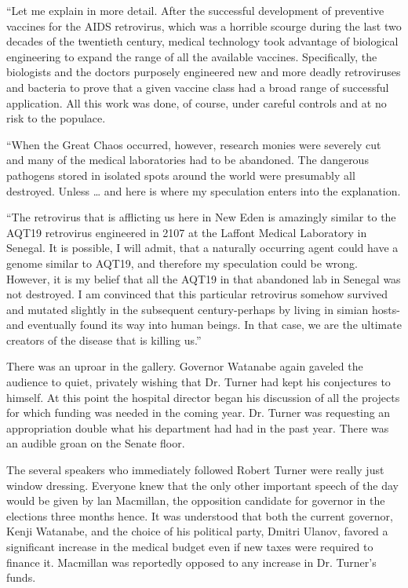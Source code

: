 \documentclass[]{article}
\begin{document}
{“Let me explain in more detail.  After the successful development of preventive vaccines for the AIDS retrovirus, which was a horrible scourge during the last two decades of the twentieth century, medical technology took advantage of biological engineering to expand the range of all the available vaccines.  Specifically, the biologists and the doctors purposely engineered new and more deadly retroviruses and bacteria to prove that a given vaccine class had a broad range of successful application.  All this work was done, of course, under careful controls and at no risk to the populace.

“When the Great Chaos occurred, however, research monies were severely cut and many of the medical laboratories had to be abandoned.  The dangerous pathogens stored in isolated spots around the world were presumably all destroyed.  Unless … and here is where my speculation enters into the explanation.

“The retrovirus that is afflicting us here in New Eden is amazingly similar to the AQT19 retrovirus engineered in 2107 at the Laffont Medical Laboratory in Senegal.  It is possible, I will admit, that a naturally occurring agent could have a genome similar to AQT19, and therefore my speculation could be wrong.  However, it is my belief that all the AQT19 in that abandoned lab in Senegal was not destroyed.  I am convinced that this particular retrovirus somehow survived and mutated slightly in the subsequent century-perhaps by living in simian hosts-and eventually found its way into human beings.  In that case, we are the ultimate creators of the disease that is killing us.”

There was an uproar in the gallery.  Governor Watanabe again gaveled the audience to quiet, privately wishing that Dr.  Turner had kept his conjectures to himself.  At this point the hospital director began his discussion of all the projects for which funding was needed in the coming year.  Dr.  Turner was requesting an appropriation double what his department had had in the past year.  There was an audible groan on the Senate floor.

The several speakers who immediately followed Robert Turner were really just window dressing.  Everyone knew that the only other important speech of the day would be given by lan Macmillan, the opposition candidate for governor in the elections three months hence.  It was understood that both the current governor, Kenji Watanabe, and the choice of his political party, Dmitri Ulanov, favored a significant increase in the medical budget even if new taxes were required to finance it.  Macmillan was reportedly opposed to any increase in Dr.  Turner’s funds.

}
\end{document}
